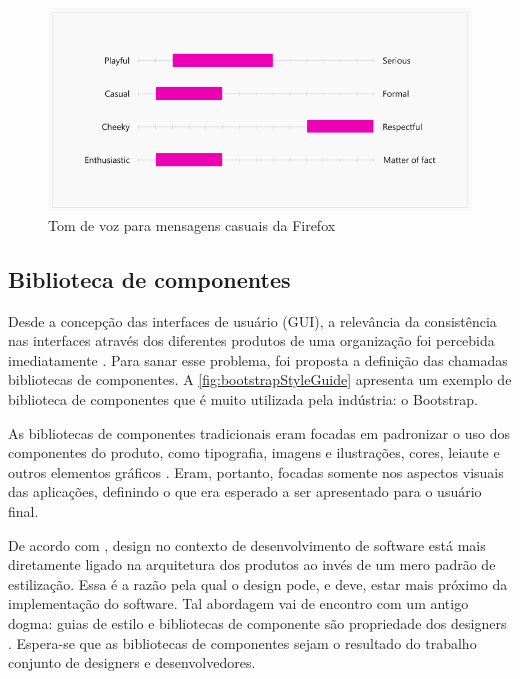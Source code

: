 \begin{figure}
	\includegraphics[width=\linewidth]{./04-figuras/02_referencial_teorico/firefox-tone-voice-02.png}
	\caption{Tom de voz para mensagens casuais da Firefox}
  \label{fig:firefoxVoiceTonePlayful}
\end{figure}

\subsection{Biblioteca de componentes}
\label{sec:bibliotecaComponentes}

Desde a concepção das interfaces de usuário (GUI), a relevância da consistência nas interfaces através dos diferentes produtos de uma organização foi percebida imediatamente \cite{ruissalo2018operating}. Para sanar esse problema, foi proposta a definição das chamadas bibliotecas de componentes. A \autoref{fig:bootstrapStyleGuide} apresenta um exemplo de biblioteca de componentes que é muito utilizada pela indústria: o Bootstrap.

As bibliotecas de componentes tradicionais eram focadas em padronizar o uso dos componentes do produto, como tipografia, imagens e ilustrações, cores, leiaute e outros elementos gráficos \cite{ruissalo2018operating}. Eram, portanto, focadas somente nos aspectos visuais das aplicações, definindo o que era esperado a ser apresentado para o usuário final.

De acordo com , design no contexto de desenvolvimento de software está mais diretamente ligado na arquitetura dos produtos ao invés de um mero padrão de estilização. Essa é a razão pela qual o design pode, e deve, estar mais próximo da implementação do software. Tal abordagem vai de encontro com um antigo dogma: guias de estilo e bibliotecas de componente são propriedade dos designers \cite{ruissalo2018operating}. Espera-se que as bibliotecas de componentes sejam o resultado do trabalho conjunto de designers e desenvolvedores.

